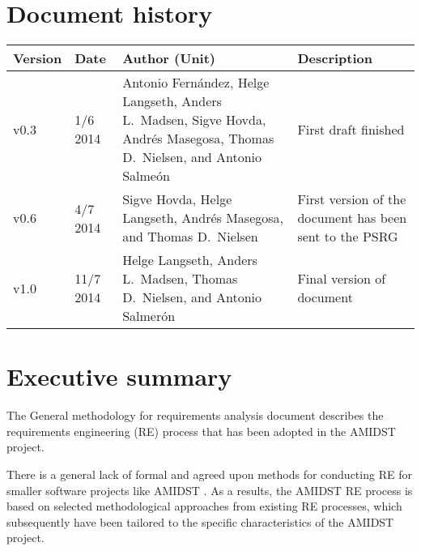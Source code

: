 \documentclass[11pt, oneside]{article}   	%
\begin{document}


%
%



\tableofcontents

\newpage


\section*{Document history}

\begin{table}[htbp]
  \centering
  \begin{tabularx}{\linewidth}{|p{17mm}|p{17mm}|X|X|}\hline
    {\bf Version} & {\bf Date} & {\bf Author (Unit)} & {\bf Description} \\ \hline \hline
    v0.3 & 1/6 2014 & Antonio Fern\'andez, Helge Langseth, Anders L.\ Madsen,  Sigve Hovda, Andr\'es Masegosa, Thomas D.\ Nielsen, and Antonio Salme\'on & First draft finished  \\ \hline
    v0.6 & 4/7 2014 & Sigve Hovda, Helge Langseth, Andr\'es Masegosa, and Thomas D.\ Nielsen& First version of the
    document has been sent to the PSRG  \\ \hline
    v1.0 & 11/7 2014 & Helge Langseth, Anders L.\ Madsen, Thomas D.\ Nielsen, and Antonio Salmer\'on & Final version of document  \\ \hline \hline
  \end{tabularx}
\end{table}

\newpage



\section{Executive summary}

The General methodology for requirements analysis document describes the requirements engineering (RE) process that has
been adopted in the AMIDST project. 

There is a general lack of formal and agreed upon methods for conducting
RE for smaller software projects like AMIDST \cite{Ara07,Qui10}. As a results, the AMIDST RE process is based on selected methodological approaches from existing
RE processes, which subsequently have  been 
tailored to the specific characteristics of the AMIDST project. 
\end{document}
